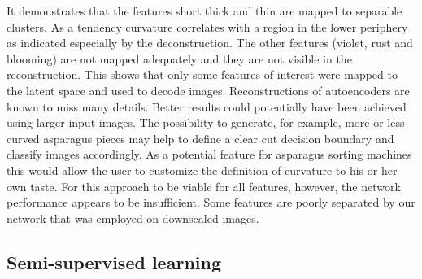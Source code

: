It demonstrates that the features short thick and thin are mapped to separable clusters. As a tendency curvature correlates with a region in the lower periphery as indicated especially by the deconstruction. The other features (violet, rust and blooming) are not mapped adequately and they are not visible in the reconstruction. This shows that only some features of interest were mapped to the latent space and used to decode images. Reconstructions of autoencoders are known to miss many details. Better results could potentially have been achieved using larger input images. The possibility to generate, for example, more or less curved asparagus pieces may help to define a clear cut decision boundary and classify images accordingly. As a potential feature for asparagus sorting machines this would allow the user to customize the definition of curvature to his or her own taste. For this approach to be viable for all features, however, the network performance appears to be insufficient. Some features are poorly separated by our network that was employed on downscaled images.



\subsection{Semi-supervised learning}

